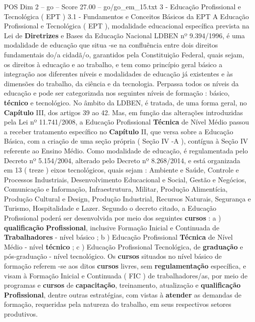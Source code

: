 \begin{textsample}{POS Dim 2 – go – Score 27.00 – go/go\_em\_15.txt}  \label{ex:f2_pos_174}
3 - Educação Profissional e Tecnológica ( EPT ) 3.1 - Fundamentos e Conceitos Básicos da EPT A Educação Profissional e Tecnológica ( EPT ), modalidade educacional específica prevista na Lei de \textbf{Diretrizes} e Bases da Educação Nacional LDBEN nº 9.394/1996, é uma modalidade de educação que situa -se na confluência entre dois direitos fundamentais do/a cidadã/o, garantidos pela Constituição Federal, quais sejam, os direitos à educação e ao trabalho, e tem como princípio geral básico a integração aos diferentes níveis e modalidades de educação já existentes e às dimensões do trabalho, da ciência e da tecnologia.
Perpassa todos os níveis da educação e pode ser categorizada nos seguintes níveis de formação : básico, \textbf{técnico} e tecnológico.
No âmbito da LDBEN, é tratada, de uma forma geral, no \textbf{Capítulo} III, dos artigos 39 ao 42.
Mas, em função das alterações introduzidas pela Lei nº 11.741/2008, a Educação Profissional \textbf{Técnica} de Nível Médio passou a receber tratamento específico no \textbf{Capítulo} II, que versa sobre a Educação Básica, com a criação de uma seção própria ( Seção IV -A ), contígua à Seção IV referente ao Ensino Médio.
Como modalidade de educação, é regulamentada pelo Decreto nº 5.154/2004, alterado pelo Decreto nº 8.268/2014, e está organizada em 13 ( treze ) eixos tecnológicos, quais sejam : Ambiente e Saúde, Controle e Processos Industriais, Desenvolvimento Educacional e Social, Gestão e Negócios, Comunicação e Informação, Infraestrutura, Militar, Produção Alimentícia, Produção Cultural e Design, Produção Industrial, Recursos Naturais, Segurança e Turismo, Hospitalidade e Lazer.
Segundo o decreto citado, a Educação Profissional poderá ser desenvolvida por meio dos seguintes \textbf{cursos} : a ) \textbf{qualificação} \textbf{Profissional}, inclusive Formação Inicial e Continuada de \textbf{Trabalhadores} - nível básico ; b ) Educação Profissional \textbf{Técnica} de Nível Médio - nível \textbf{técnico} ; c ) Educação Profissional Tecnológica, de \textbf{graduação} e pós-graduação - nível tecnológico.
Os \textbf{cursos} situados no nível básico de formação referem -se aos ditos \textbf{cursos} livres, sem \textbf{regulamentação} específica, e visam à Formação Inicial e Continuada ( FIC ) de trabalhadores/as, por meio de programas e \textbf{cursos} de \textbf{capacitação}, treinamento, atualização e \textbf{qualificação} \textbf{Profissional}, dentre outras estratégias, com vistas à \textbf{atender} as demandas de formação, requeridas pela natureza do trabalho, em seus respectivos setores produtivos.

\end{textsample}
